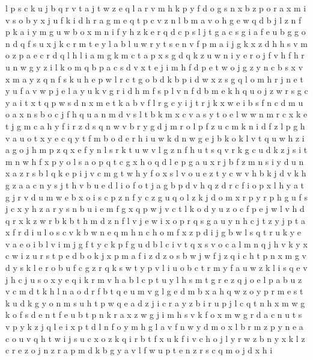 \documentclass{article}
\begin{document}
l p s c k u j b q r v t a
j t w z e q l a r v m h k p y f d o g s n x b
z p o r a x m i v
s o b y x j u f k i d h r a g m e q t p c v z n l
b m a v o h g e w q d
b j l z n f p k a i y m g
u w b o x m n i f y h z k e r q d c p s l j t g a
c s g i a f
e u b g
g o n d q f s u x j k c r m t e y l a
b l u w r y t s e n v f p m a i j g k x z d h
h s v m o z p a e c r d q l
h l i a m g k
m c t a p x s g d q k z u w n i y e r o j f v h
f h r u n w g y z i l k o m q b p a c s d v x t e j
i m h f d p e t w o j g z y n c b s x
v x m a y z q n f s k u h e p w l r c t g o b d
k b p i d w x z s g q l o m h r j n e t y u f a v
w p j e l a y u k v g r i d h m f s
p l v n f d b m e k h q u o j z w r s g c y a i t x
t
q p w s d n x m e t k a b v f l r g c y i j
t r j k x w e i b s f n c d m u o a
x n s b o
c j f h q u a n m d v s l t
b k m x c v a s y t o e l w
w n m r c x
k e t j g m c a h y f i r z d s q n w v
b r y g d
j m r o l p f z u c
m k n i d f z l p g h v a u o t x y e c q
y t f m b o d e r h i u w k
d
n w g e j b k
o k l v t q u w h z
i a g o j h m p z q x e f y n l s r k t u w v
l g z n f h u t s q v r k
g c u d k z j s i t m n w h f x p y o
l s a o p q t c g x h
o q d l e p g a u x r j b f z m n s i y
d u n x a z r s b l q k e p i j v c m g t w h y f o
x s l v o u e z
t y c w v h b k
j d v k h g z a
a c n y s j t h v b u e d l i o f
o t j a g b p d v h
q z d r c f i o p x
l h y a t g j r v d u m w e b x o i s c p z n f
y c z g u q
o
l z k
j d o m x
r p y
r p h g u f s j c x y
h z a r y s n b u i e m f g x q p w j v c t l k o d
y u z o c f p e j w l v h d q r x
k z w r b
k b t h m d z n f l v j e w i x o p r q s g a u y
n h c j t z
y j p t a x f r d i u l o s c v k b w n e q m h
n c h o m f x z p d i j g b w l s q t r u k y e v a
e o i b
l v i m j g f t y c k p
f
g u d b l c i v t q x s
v o c a
l m n q j h v k y x c w i z u r s t p e d b o
k j x p m a f i z d
z o s b w j
w f j z q i c h t p n x m g v d y s k l e r o b u
f c g z r q k s w t y p v l i u o b
c t r m y f a u w z k l i s q e v j
h c
j u s o x y e q i k r m v h a b l c p t
u y l
h s m t g r e z q
j o e l p a b u z v c m d t k h
l n a o d r f b t q e u m v g
l g e d m
b x a h q w z o y p r m e s t k u d
k g y o n m s u h t p w q e a d z j i c r
a y z b i r u p j l c q t n h x m w g k o f s d e
n t
f e u b t p n k r a x z w g j i m h s v
k
f o x m w g r d a c n u t s v p y k z j q l e i
x p t d l n f
o y m h g l a
v f n w y d m o
x l b r m z p y n e a c o u v q h t w i j s
u c x o z k q i r b t f
x u k f i v c h o j l y r w z
b n y x k l z c
r e z
o j n z r a p m d
k b g y a v l f w u p t e n z r s c q m o j d x h i
\end{document}
